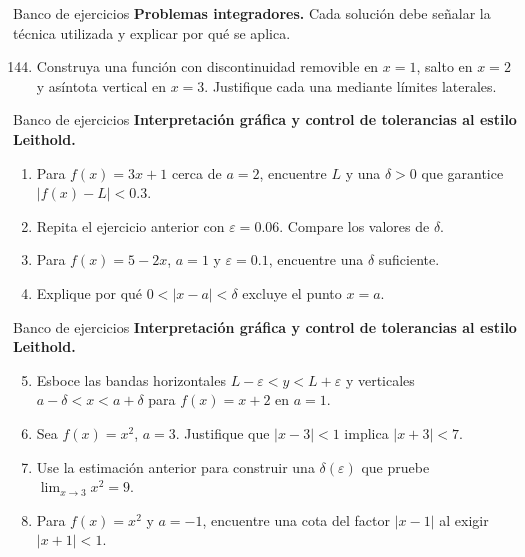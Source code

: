 \documentclass[12pt,aspectratio=169]{beamer}
\begin{document}
\begin{frame}[t,allowframebreaks]{Banco de ejercicios}
\small
\noindent \textbf{Problemas integradores.} Cada solución debe señalar la técnica utilizada y explicar por qué se aplica.\par\smallskip
\begin{enumerate}\setcounter{enumi}{143}
\item Construya una función con discontinuidad removible en $x=1$, salto en $x=2$ y asíntota vertical en $x=3$. Justifique cada una mediante límites laterales.
\end{enumerate}
\end{frame}


\begin{frame}[t,allowframebreaks]{Banco de ejercicios}
\small
\noindent \textbf{Interpretación gráfica y control de tolerancias al estilo Leithold.}\par\smallskip
\begin{enumerate}\setcounter{enumi}{0}
\item Para $f(x)=3x+1$ cerca de $a=2$, encuentre $L$ y una $\delta>0$ que garantice $|f(x)-L|<0.3$.
\item Repita el ejercicio anterior con $\varepsilon=0.06$. Compare los valores de $\delta$.
\item Para $f(x)=5-2x$, $a=1$ y $\varepsilon=0.1$, encuentre una $\delta$ suficiente.
\item Explique por qué $0<|x-a|<\delta$ excluye el punto $x=a$.
\end{enumerate}
\end{frame}


\begin{frame}[t,allowframebreaks]{Banco de ejercicios}
\small
\noindent \textbf{Interpretación gráfica y control de tolerancias al estilo Leithold.}\par\smallskip
\begin{enumerate}\setcounter{enumi}{4}
\item Esboce las bandas horizontales $L-\varepsilon<y<L+\varepsilon$ y verticales $a-\delta<x<a+\delta$ para $f(x)=x+2$ en $a=1$.
\item Sea $f(x)=x^2$, $a=3$. Justifique que $|x-3|<1$ implica $|x+3|<7$.
\item Use la estimación anterior para construir una $\delta(\varepsilon)$ que pruebe $\lim_{x\to3}x^2=9$.
\item Para $f(x)=x^2$ y $a=-1$, encuentre una cota del factor $|x-1|$ al exigir $|x+1|<1$.
\end{enumerate}
\end{frame}
\end{document}
